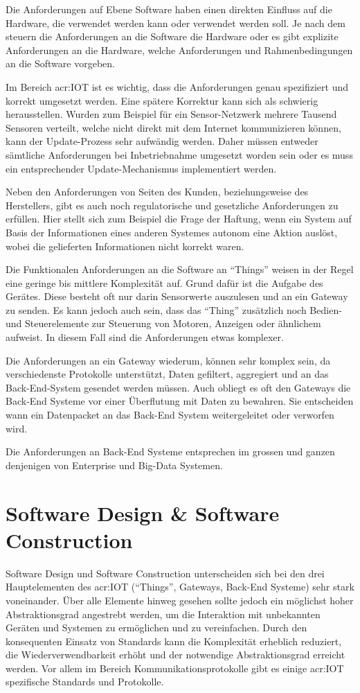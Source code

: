 Die Anforderungen auf Ebene Software haben einen direkten Einfluss auf die Hardware, die verwendet werden kann oder verwendet werden soll. Je nach dem steuern die Anforderungen an die Software die Hardware oder es gibt explizite Anforderungen an die Hardware, welche Anforderungen und Rahmenbedingungen an die Software vorgeben. 

Im Bereich \gls{acr:IOT} ist es wichtig, dass die Anforderungen genau spezifiziert und korrekt umgesetzt werden. Eine spätere Korrektur kann sich als schwierig herausstellen. Wurden zum Beispiel für ein Sensor-Netzwerk mehrere Tausend Sensoren verteilt, welche nicht direkt mit dem Internet kommunizieren können, kann der Update-Prozess sehr aufwändig werden. Daher müssen entweder sämtliche Anforderungen bei Inbetriebnahme umgesetzt worden sein oder es muss ein entsprechender Update-Mechanismus implementiert werden.

Neben den Anforderungen von Seiten des Kunden, beziehungsweise des Herstellers, gibt es auch noch regulatorische und gesetzliche Anforderungen zu erfüllen. Hier stellt sich zum Beispiel die Frage der Haftung, wenn ein System auf Basis der Informationen eines anderen Systemes autonom eine Aktion auslöst, wobei die gelieferten Informationen nicht korrekt waren.

Die Funktionalen Anforderungen an die Software an "`Things"' weisen in der Regel eine geringe bis mittlere Komplexität auf. Grund dafür ist die Aufgabe des Gerätes. Diese besteht oft nur darin Sensorwerte auszulesen und an ein Gateway zu senden. Es kann jedoch auch sein, dass das "`Thing"' zusätzlich noch Bedien- und Steuerelemente zur Steuerung von Motoren, Anzeigen oder ähnlichem aufweist. In diesem Fall sind die Anforderungen etwas komplexer.

Die Anforderungen an ein Gateway wiederum, können sehr komplex sein, da verschiedenste Protokolle unterstützt, Daten gefiltert, aggregiert und an das Back-End-System gesendet werden müssen. Auch obliegt es oft den Gateways die Back-End Systeme vor einer Überflutung mit Daten zu bewahren. Sie entscheiden wann ein Datenpacket an das Back-End System weitergeleitet oder verworfen wird. 

Die Anforderungen an Back-End Systeme entsprechen im grossen und ganzen denjenigen von Enterprise und Big-Data Systemen.



\section{Software Design \& Software Construction} \label{sec:SWDesignConstruction}
Software Design und Software Construction unterscheiden sich bei den drei Hauptelementen des \gls{acr:IOT} ("`Things"', Gateways, Back-End Systeme) sehr stark voneinander. Über alle Elemente hinweg gesehen sollte jedoch ein möglichst hoher Abstraktionsgrad angestrebt werden, um die Interaktion mit unbekannten Geräten und Systemen zu ermöglichen und zu vereinfachen. Durch den konsequenten Einsatz von Standards kann die Komplexität erheblich reduziert, die Wiederverwendbarkeit erhöht und der notwendige Abstraktionsgrad erreicht werden. Vor allem im Bereich Kommunikationsprotokolle gibt es einige \gls{acr:IOT} spezifische Standards und Protokolle.

